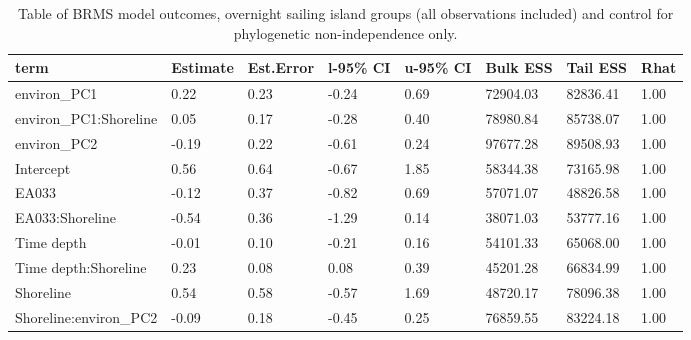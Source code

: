 \begin{table}[ht]
\centering
\begin{tabular}{p{3cm}p{1.35cm}p{1.35cm}p{1.35cm}p{1.35cm}p{1.35cm}p{1.35cm}p{1.35cm}}
  \toprule
term & Estimate & Est.Error & l-95\% CI & u-95\% CI & Bulk ESS & Tail ESS & Rhat \\ 
  \midrule
environ\_PC1 & 0.22 & 0.23 & -0.24 & 0.69 & 72904.03 & 82836.41 & 1.00 \\ 
  environ\_PC1:Shoreline & 0.05 & 0.17 & -0.28 & 0.40 & 78980.84 & 85738.07 & 1.00 \\ 
  environ\_PC2 & -0.19 & 0.22 & -0.61 & 0.24 & 97677.28 & 89508.93 & 1.00 \\ 
  Intercept & 0.56 & 0.64 & -0.67 & 1.85 & 58344.38 & 73165.98 & 1.00 \\ 
  EA033 & -0.12 & 0.37 & -0.82 & 0.69 & 57071.07 & 48826.58 & 1.00 \\ 
  EA033:Shoreline & -0.54 & 0.36 & -1.29 & 0.14 & 38071.03 & 53777.16 & 1.00 \\ 
  Time depth & -0.01 & 0.10 & -0.21 & 0.16 & 54101.33 & 65068.00 & 1.00 \\ 
  Time depth:Shoreline & 0.23 & 0.08 & 0.08 & 0.39 & 45201.28 & 66834.99 & 1.00 \\ 
  Shoreline & 0.54 & 0.58 & -0.57 & 1.69 & 48720.17 & 78096.38 & 1.00 \\ 
  Shoreline:environ\_PC2 & -0.09 & 0.18 & -0.45 & 0.25 & 76859.55 & 83224.18 & 1.00 \\ 
   \bottomrule
\end{tabular}
\caption{Table of BRMS model outcomes, overnight sailing island groups (all observations included) and control for phylogenetic non-independence only.} 
\label{BRMS_effects_SBZR_control_phylo}
\end{table}
